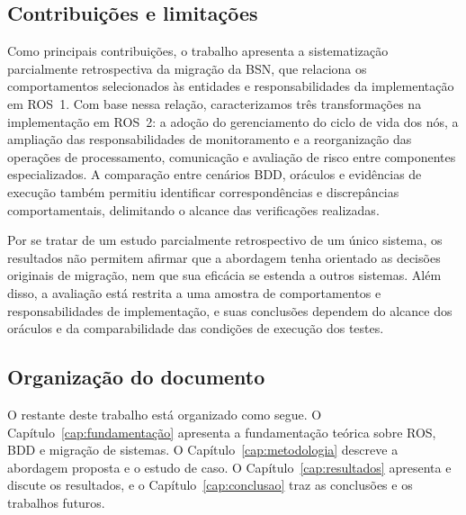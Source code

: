 \subsection{Contribuições e limitações}

Como principais contribuições, o trabalho apresenta a sistematização parcialmente retrospectiva da migração da BSN, que relaciona os comportamentos selecionados às entidades e responsabilidades da implementação em ROS~1. Com base nessa relação, caracterizamos três transformações na implementação em ROS~2: a adoção do gerenciamento do ciclo de vida dos nós, a ampliação das responsabilidades de monitoramento e a reorganização das operações de processamento, comunicação e avaliação de risco entre componentes especializados.
A comparação entre cenários BDD, oráculos e evidências de execução também permitiu identificar correspondências e discrepâncias comportamentais, delimitando o alcance das verificações realizadas.

Por se tratar de um estudo parcialmente retrospectivo de um único sistema, os resultados não permitem afirmar que a abordagem tenha orientado as decisões originais de migração, nem que sua eficácia se estenda a outros sistemas. Além disso, a avaliação está restrita a uma amostra de comportamentos e responsabilidades de implementação, e suas conclusões dependem do alcance dos oráculos e da comparabilidade das condições de execução dos testes.
\subsection{Organização do documento}

O restante deste trabalho está organizado como segue. O Capítulo~\ref{cap:fundamentação} apresenta a fundamentação teórica sobre ROS, BDD e migração de sistemas. O Capítulo~\ref{cap:metodologia} descreve a abordagem proposta e o estudo de caso. O Capítulo~\ref{cap:resultados} apresenta e discute os resultados, e o Capítulo~\ref{cap:conclusao} traz as conclusões e os trabalhos futuros.
